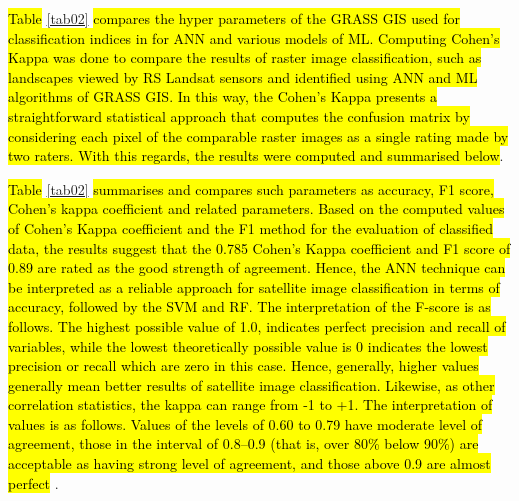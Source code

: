 \documentclass[jmse,article,submit,pdftex,moreauthors]{Definitions/mdpi}
\begin{document}
 \hl{Table} \ref{tab02} \hl{compares the hyper parameters of the GRASS GIS used for classification indices in for ANN and various models of ML. Computing Cohen's Kappa was done to compare the results of raster image classification, such as landscapes viewed by RS Landsat sensors and identified using ANN and ML algorithms of GRASS GIS. In this way, the Cohen's Kappa presents a straightforward statistical approach that computes the confusion matrix by considering each pixel of the comparable raster images as a single rating made by two raters. With this regards, the results were computed and summarised below}.
 
 \hl{Table} \ref{tab02} \hl{summarises and compares such parameters as accuracy, F1 score, Cohen's kappa coefficient and related parameters. Based on the computed values of Cohen's Kappa coefficient and the F1 method for the evaluation of classified data, the results suggest that the 0.785 Cohen's Kappa coefficient and F1 score of 0.89 are rated as the good strength of agreement. Hence, the ANN technique can be interpreted as a reliable approach for satellite image classification in terms of accuracy, followed by the SVM and RF. The interpretation of the  F-score is as follows. The highest possible value of 1.0, indicates perfect precision and recall of variables, while the lowest theoretically possible value is 0 indicates the lowest precision or recall which are zero in this case. Hence, generally, higher values generally mean better results of satellite image classification. Likewise, as other correlation statistics, the kappa can range from -1 to +1. The interpretation of values is as follows. Values of the levels of 0.60 to 0.79 have moderate level of agreement, those in the interval of 0.8--0.9 (that is, over 80\% below 90\%) are acceptable as having strong level of agreement, and those above 0.9 are almost perfect} \cite{McHugh}.
 
\end{document}
